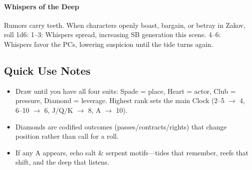 \paragraph{Whispers of the Deep}
Rumors carry teeth. When characters openly boast, bargain, or betray in Zakov, roll 1d6:  
1--3: Whispers spread, increasing SB generation this scene.  
4--6: Whispers favor the PCs, lowering suspicion until the tide turns again.

\subsection*{Quick Use Notes}
\begin{itemize}
\item Draw until you have all four suits: Spade = place, Heart = actor, Club = pressure, Diamond = leverage. Highest rank sets the main Clock (2--5 $\rightarrow$ 4, 6--10 $\rightarrow$ 6, J/Q/K $\rightarrow$ 8, A $\rightarrow$ 10).
\item Diamonds are codified outcomes (passes/contracts/rights) that change position rather than call for a roll.
\item If any A appears, echo salt \& serpent motifs---tides that remember, reefs that shift, and the deep that listens.
\end{itemize}
